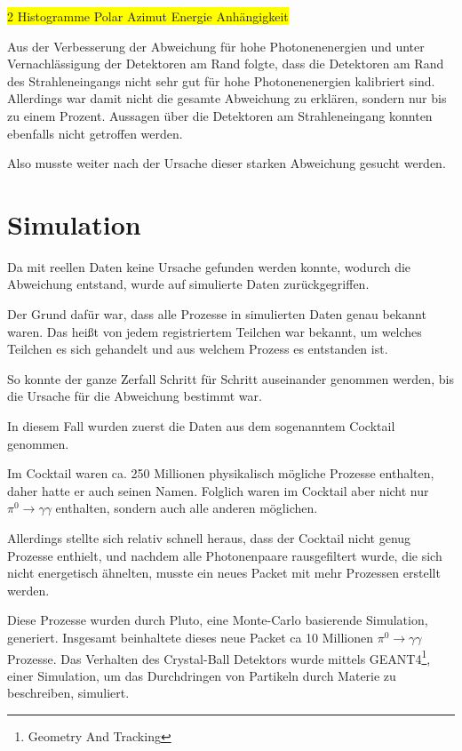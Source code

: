 \documentclass[a4paper,11pt,oneside,final,german,openbib,pdftex]{scrbook}
\begin{document}
{\colorbox{yellow}{2 Histogramme Polar Azimut Energie Anh\"angigkeit}

Aus der Verbesserung der Abweichung f\"ur hohe Photonenenergien und unter Vernachl\"assigung der Detektoren am Rand folgte, dass die Detektoren am Rand des Strahleneingangs nicht sehr gut f\"ur hohe Photonenenergien kalibriert sind. Allerdings war damit nicht die gesamte Abweichung zu erkl\"aren, sondern nur bis zu einem Prozent. 
Aussagen \"uber die Detektoren am Strahleneingang konnten ebenfalls nicht getroffen werden.

Also musste weiter nach der Ursache dieser starken Abweichung gesucht werden.


\section{Simulation}
\label{sec:Z-Vertex-Abaengigkeit}
Da mit reellen Daten keine Ursache gefunden werden konnte, wodurch die Abweichung entstand, wurde auf simulierte Daten zur\"uckgegriffen. 

Der Grund daf\"ur war, dass alle Prozesse in simulierten Daten genau bekannt waren. Das hei{\ss}t von jedem registriertem Teilchen war bekannt, um welches Teilchen es sich gehandelt und aus welchem Prozess es entstanden ist. 

So konnte der ganze Zerfall Schritt f\"ur Schritt auseinander genommen werden, bis die Ursache f\"ur die Abweichung bestimmt war.

In diesem Fall wurden zuerst die Daten aus dem sogenanntem Cocktail genommen. 

Im Cocktail waren ca. 250 Millionen physikalisch m\"ogliche Prozesse enthalten, daher hatte er auch seinen Namen. Folglich waren im Cocktail aber nicht nur $\pi^0 \rightarrow \gamma \gamma$ enthalten, sondern auch alle anderen m\"oglichen.

Allerdings stellte sich relativ schnell heraus, dass der Cocktail nicht genug Prozesse enthielt, und nachdem alle Photonenpaare rausgefiltert wurde, die sich nicht energetisch \"ahnelten, musste ein neues Packet mit mehr Prozessen erstellt werden.

Diese Prozesse wurden durch Pluto, eine Monte-Carlo basierende Simulation, generiert. Insgesamt beinhaltete dieses neue Packet ca 10 Millionen $\pi^0 \rightarrow \gamma \gamma$ Prozesse. Das Verhalten des Crystal-Ball Detektors wurde mittels GEANT4\footnote{Geometry And Tracking}, einer Simulation, um das Durchdringen von Partikeln durch Materie zu beschreiben, simuliert.

}
\end{document}
